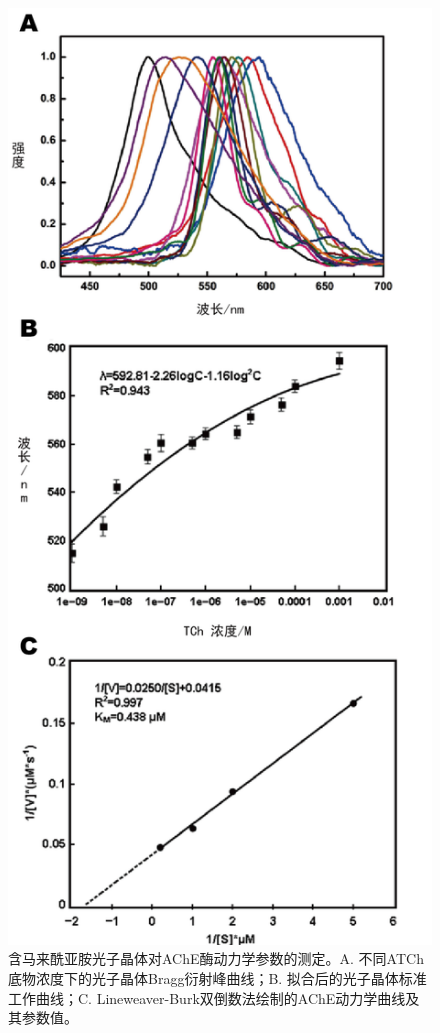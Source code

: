 \begin{figure}[htbp]
  \centering
  \includegraphics[height=0.8\textheight]{figures/ch3/maleimide-kinetics.png}
  \caption{含马来酰亚胺光子晶体对AChE酶动力学参数的测定。A. 不同ATCh底物浓度下的光子晶体Bragg衍射峰曲线；B. 拟合后的光子晶体标准工作曲线；C. Lineweaver-Burk双倒数法绘制的AChE动力学曲线及其参数值。}
  \label{fig:maleimide-kinetics}
\end{figure}

